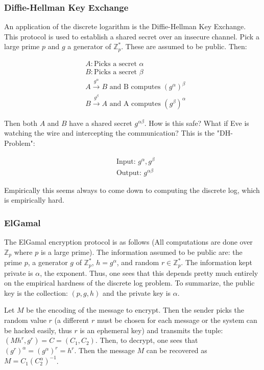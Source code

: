 \documentclass[12pt,a4paper]{article}
\begin{document}
\subsubsection{Diffie-Hellman Key Exchange}
An application of the discrete logarithm is the Diffie-Hellman Key Exchange. This protocol is used to establish a shared secret over an insecure channel. Pick a large prime $p$ and $g$ a generator of $\mathbb{Z}_{p}^{\ast}$. These are assumed to be public. Then: 

\begin{align*}
&A: \text{Picks a secret } \alpha\\
&B: \text{Picks a secret } \beta \\
&A \xrightarrow{g^{\alpha}} B \text{ and B computes } (g^{\alpha})^{\beta}\\
&B \xrightarrow{g^{\beta}} A \text{ and A computes } (g^{\beta})^{\alpha}
\end{align*}

Then both $A$ and $B$ have a shared secret $g^{\alpha\beta}$. How is this safe? What if Eve is watching the wire and intercepting the communication? This is the "DH-Problem":

\begin{align*}
	&\text{Input: } g^{\alpha}, g^{\beta} \\
	&\text{Output: } g^{\alpha\beta}
\end{align*}

Empirically this seems always to come down to computing the discrete log, which is empirically hard.
\subsubsection{ElGamal}
The ElGamal encryption protocol is as follows (All computations are done over $\mathbb{Z}_{p}$ where $p$ is a large prime). The information assumed to be public are: the prime $p$, a generator $g$ of $\mathbb{Z}_{p}^{\ast}$, $h = g^{\alpha}$, and random $r\in\mathbb{Z}_{p}^{\ast}$. The information kept private is $\alpha$, the exponent. Thus, one sees that this depends pretty much entirely on the empirical hardness of the discrete log problem. To summarize, the public key is the collection: $(p, g, h)$ and the private key is $\alpha$. 

Let $M$ be the encoding of the message to encrypt. Then the sender picks the random value $r$ (a different $r$ must be chosen for each message or the system can be hacked easily, thus $r$ is an ephemeral key) and transmits the tuple: $(Mh^{r}, g^{r}) = C = (C_{1}, C_{2})$. Then, to decrypt, one sees that $(g^{r})^{\alpha} = (g^{\alpha})^{r}  = h^{r}$. Then the message $M$ can be recovered as $M = C_{1}(C_{2}^{\alpha})^{-1}$. 
\end{document}
